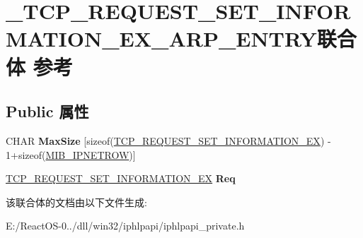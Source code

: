 \hypertarget{union___t_c_p___r_e_q_u_e_s_t___s_e_t___i_n_f_o_r_m_a_t_i_o_n___e_x___a_r_p___e_n_t_r_y}{}\section{\+\_\+\+T\+C\+P\+\_\+\+R\+E\+Q\+U\+E\+S\+T\+\_\+\+S\+E\+T\+\_\+\+I\+N\+F\+O\+R\+M\+A\+T\+I\+O\+N\+\_\+\+E\+X\+\_\+\+A\+R\+P\+\_\+\+E\+N\+T\+R\+Y联合体 参考}
\label{union___t_c_p___r_e_q_u_e_s_t___s_e_t___i_n_f_o_r_m_a_t_i_o_n___e_x___a_r_p___e_n_t_r_y}
\subsection*{Public 属性}
\begin{DoxyCompactItemize}
\item 
\mbox{\label{union___t_c_p___r_e_q_u_e_s_t___s_e_t___i_n_f_o_r_m_a_t_i_o_n___e_x___a_r_p___e_n_t_r_y_a943c0c090418f0785dac2794277e71f4}} 
C\+H\+AR {\bfseries Max\+Size} \mbox{[}sizeof(\hyperlink{struct___t_c_p___r_e_q_u_e_s_t___s_e_t___i_n_f_o_r_m_a_t_i_o_n___e_x}{T\+C\+P\+\_\+\+R\+E\+Q\+U\+E\+S\+T\+\_\+\+S\+E\+T\+\_\+\+I\+N\+F\+O\+R\+M\+A\+T\+I\+O\+N\+\_\+\+EX}) -\/ 1+sizeof(\hyperlink{struct___m_i_b___i_p_n_e_t_r_o_w}{M\+I\+B\+\_\+\+I\+P\+N\+E\+T\+R\+OW})\mbox{]}
\item 
\mbox{\label{union___t_c_p___r_e_q_u_e_s_t___s_e_t___i_n_f_o_r_m_a_t_i_o_n___e_x___a_r_p___e_n_t_r_y_af8c1ab5dc53481f40969f2e62561993d}} 
\hyperlink{struct___t_c_p___r_e_q_u_e_s_t___s_e_t___i_n_f_o_r_m_a_t_i_o_n___e_x}{T\+C\+P\+\_\+\+R\+E\+Q\+U\+E\+S\+T\+\_\+\+S\+E\+T\+\_\+\+I\+N\+F\+O\+R\+M\+A\+T\+I\+O\+N\+\_\+\+EX} {\bfseries Req}
\end{DoxyCompactItemize}


该联合体的文档由以下文件生成\+:\begin{DoxyCompactItemize}
\item 
E\+:/\+React\+O\+S-\/0../dll/win32/iphlpapi/iphlpapi\+\_\+private.\+h\end{DoxyCompactItemize}
